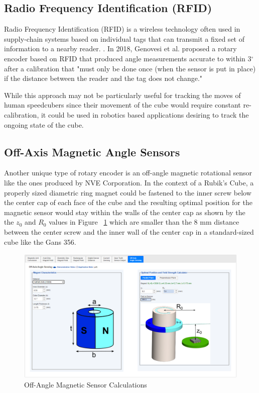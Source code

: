 \subsection{Radio Frequency Identification (RFID)}
\label{subsec:rfid}

Radio Frequency Identification (RFID) is a wireless technology often
used in supply-chain systems \cite{rfid-rotary-encoder} based on
individual tags that can transmit a fixed set of information to a
nearby reader. \cite{fda-rfid}. In 2018, Genovesi et al. proposed a
rotary encoder based on RFID that produced angle measurements accurate
to within 3$^\circ$ after a calibration that "must only be done once
(when the sensor is put in place) if the distance between the reader
and the tag does not change." \cite{rfid-rotary-encoder}

While this approach may not be particularly useful for tracking the
moves of human speedcubers since their movement of the cube would
require constant re-calibration, it could be used in robotics based
applications desiring to track the ongoing state of the cube.

\subsection{Off-Axis Magnetic Angle Sensors}
\label{subsec:magnetic-angle-sensors}

Another unique type of rotary encoder is an off-angle magnetic
rotational sensor like the ones produced by NVE Corporation.
\cite{nve-mag-sensor} In the context of a Rubik's Cube, a properly
sized diametric ring magnet could be fastened to the inner screw below
the center cap of each face of the cube and the resulting optimal
position for the magnetic sensor would stay within the walls of the
center cap as shown by the the $z_0$ and $R_0$ values in Figure
~\ref{fig:nve-mag-calculations} which are smaller than the 8 mm
distance between the center screw and the inner wall of the center cap
in a standard-sized cube like the Gans 356.

\begin{figure}[h]
    \centering
    \caption[Off-Angle Magnetic Sensor Calculations]{Off-Angle Magnetic Sensor Calculations \cite{nve-mag-sensor-calculations}}
    \label{fig:nve-mag-calculations}
    \includegraphics[width=\linewidth]{Figures/3 State of the Art/nve-mag-calculations.png}
\end{figure}


